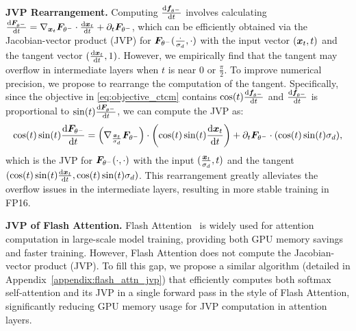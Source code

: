 \textbf{JVP Rearrangement. }
Computing $\frac{\mathrm{d} {\bm{f}}_{\theta^-}}{\mathrm{d} t}$ involves calculating $\frac{\mathrm{d} {\bm{F}}_{\theta^-}}{\mathrm{d} t} = \nabla_{{\bm{x}}_t}{\bm{F}}_{\theta^-}\cdot \frac{\mathrm{d} {\bm{x}}_t}{\mathrm{d} t} + \partial_t {\bm{F}}_{\theta^-}$, which can be efficiently obtained via the Jacobian-vector product (JVP) for ${\bm{F}}_{\theta^-}(\frac{\cdot}{\sigma_d}, \cdot)$ with the input vector $({\bm{x}}_t, t)$ and the tangent vector $(\frac{\mathrm{d} {\bm{x}}_t}{\mathrm{d} t}, 1)$. However, we empirically find that the tangent may overflow in intermediate layers when $t$ is near 0 or $\frac{\pi}{2}$. To improve numerical precision, we propose to rearrange the computation of the tangent. Specifically, since the objective in \eqref{eq:objective_ctcm} contains $\cos(t)\frac{\mathrm{d} {\bm{f}}_{\theta^-}}{\mathrm{d} t}$ and $\frac{\mathrm{d} {\bm{f}}_{\theta^-}}{\mathrm{d} t}$ is proportional to $\sin(t)\frac{\mathrm{d} {\bm{F}}_{\theta^-}}{\mathrm{d} t}$, we can compute the JVP as:
\begin{equation*}
    \cos(t)\sin(t)\frac{\mathrm{d} {\bm{F}}_{\theta^-}}{\mathrm{d} t} = \left(\nabla_{\frac{{\bm{x}}_t}{\sigma_d}}{\bm{F}}_{\theta^-}\right) \cdot \left(\cos(t)\sin(t)\frac{\mathrm{d} {\bm{x}}_t}{\mathrm{d} t}\right) + \partial_t {\bm{F}}_{\theta^-}\cdot (\cos(t)\sin(t)\sigma_d),
\end{equation*}
which is the JVP for ${\bm{F}}_{\theta^-}(\cdot,\cdot)$ with the input $(\frac{{\bm{x}}_t}{\sigma_d}, t)$ and the tangent $(\cos(t)\sin(t)\frac{\mathrm{d} {\bm{x}}_t}{\mathrm{d} t}, \allowbreak \cos(t)\sin(t)\sigma_d)$. This rearrangement greatly alleviates the overflow issues in the intermediate layers, resulting in more stable training in FP16.

\textbf{JVP of Flash Attention. }
Flash Attention~\citep{dao2022flashattention,dao2023flashattention2} is widely used for attention computation in large-scale model training, providing both GPU memory savings and faster training. However, Flash Attention does not compute the Jacobian-vector product (JVP). To fill this gap, we propose a similar algorithm (detailed in Appendix~\ref{appendix:flash_attn_jvp}) that efficiently computes both softmax self-attention and its JVP in a single forward pass in the style of Flash Attention, significantly reducing GPU memory usage for JVP computation in attention layers.





